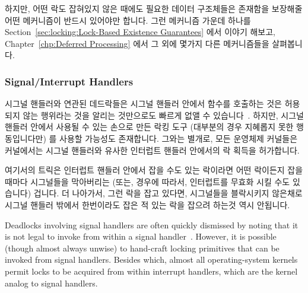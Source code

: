 하지만, 어떤 락도 잡혀있지 않은 때에도 필요한 데이터 구조체들은 존재함을
보장해줄 어떤 메커니즘이 반드시 있어야만 합니다.
그런 메커니즘 가운데 하나를
Section~\ref{sec:locking:Lock-Based Existence Guarantees} 에서 이야기 해보고,
Chapter~\ref{chp:Deferred Processing} 에서 그
외에 몇가지 다른 메커니즘들을 살펴봅니다.

\subsubsection{Signal/Interrupt Handlers}
\label{sec:locking:Signal/Interrupt Handlers}

시그널 핸들러와 연관된 데드락들은 시그널 핸들러 안에서
 함수를 호출하는 것은 허용되지 않는 행위라는 것을
알리는 것만으로도 빠르게 없앨 수 있습니다~\cite{OpenGroup1997pthreads}.
하지만, 시그널 핸들러 안에서 사용될 수 있는 손으로 만든 락킹 도구 (대부분의
경우 지혜롭지 못한 행동입니다만) 를 사용할 가능성도 존재합니다.
그와는 별개로, 모든 운영체제 커널들은 커널에서는 시그널 핸들러와 유사한
인터럽트 핸들러 안에서의 락 획득을 허가합니다.

여기서의 트릭은 인터럽트 핸들러 안에서 잡을 수도 있는 락이라면 어떤 락이든지
잡을 때마다 시그널들을 막아버리는 (또는, 경우에 따라서, 인터럽트를 무효화 시킬
수도 있습니다) 겁니다.
더 나아가서, 그런 락을 잡고 있다면, 시그널들을 블락시키지 않은채로 시그널
핸들러 밖에서 한번이라도 잡은 적 있는 락을 잡으려 하는것 역시 안됩니다.
\iffalse

Deadlocks involving signal handlers are often quickly dismissed by
noting that it is not legal to invoke  from
within a signal handler~\cite{OpenGroup1997pthreads}.
However, it is possible (though almost always unwise) to hand-craft
locking primitives that can be invoked from signal handlers.
Besides which, almost all operating-system kernels permit locks to
be acquired from within interrupt handlers, which are the kernel analog
to signal handlers.

